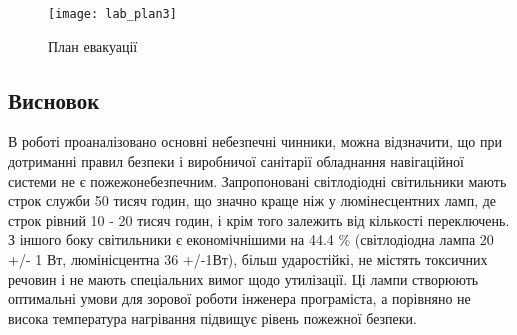 \begin{figure}[H]
\centering
\texttt{[image: lab\_plan3]}
\caption{План евакуації}\label{fig:lab_evac}
\end{figure}


\subsection{Висновок}
В роботі проаналізовано основні небезпечні чинники, можна відзначити, що при дотриманні правил безпеки і виробничої санітарії обладнання навігаційної системи не є пожежонебезпечним. Запропоновані світлодіодні світильники мають строк служби 50 тисяч годин, що значно краще ніж у люмінесцентних ламп, де строк рівний 10 - 20 тисяч годин, і крім того залежить від кількості переключень. З іншого боку світильники є економічнішими на 44.4 \% (світлодіодна лампа 20 +/- 1 Вт, люмінісцентна 36 +/-1Вт), більш ударостійкі, не містять токсичних речовин і не мають спеціальних вимог щодо утилізації. Ці лампи створюють оптимальні умови для зорової роботи інженера програміста, а порівняно не висока температура нагрівання підвищує рівень пожежної безпеки.

% 
